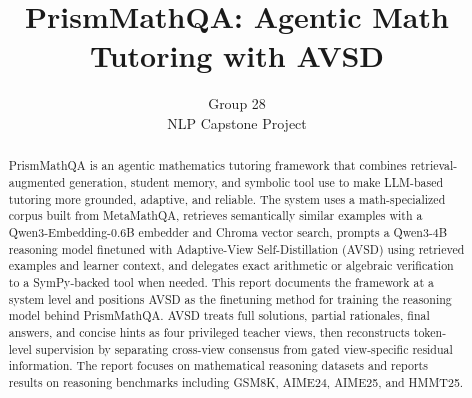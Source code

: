 \documentclass{article}
\title{PrismMathQA: Agentic Math Tutoring with AVSD}
\author{
  Group 28 \\
  NLP Capstone Project
}
\begin{document}
\maketitle

\begin{abstract}
PrismMathQA is an agentic mathematics tutoring framework that combines retrieval-augmented generation, student memory, and symbolic tool use to make LLM-based tutoring more grounded, adaptive, and reliable. The system uses a math-specialized corpus built from MetaMathQA, retrieves semantically similar examples with a Qwen3-Embedding-0.6B embedder and Chroma vector search, prompts a Qwen3-4B reasoning model finetuned with Adaptive-View Self-Distillation (AVSD) using retrieved examples and learner context, and delegates exact arithmetic or algebraic verification to a SymPy-backed tool when needed. This report documents the framework at a system level and positions AVSD as the finetuning method for training the reasoning model behind PrismMathQA. AVSD treats full solutions, partial rationales, final answers, and concise hints as four privileged teacher views, then reconstructs token-level supervision by separating cross-view consensus from gated view-specific residual information. The report focuses on mathematical reasoning datasets and reports results on reasoning benchmarks including GSM8K, AIME24, AIME25, and HMMT25.
\end{abstract}










\end{document}
